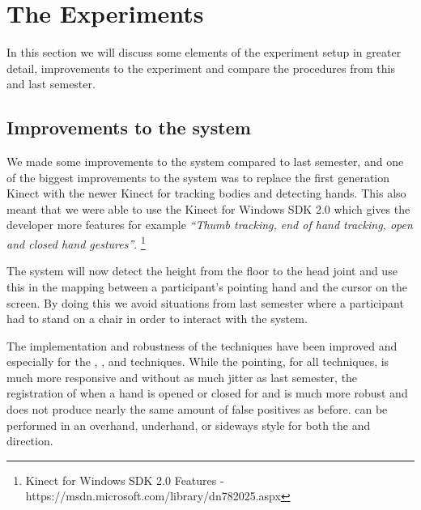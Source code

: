 \section*{The Experiments} \label{sec:experiments}
In this section we will discuss some elements of the experiment setup in greater detail, improvements to the experiment and compare the procedures from this and last semester.

\subsection*{Improvements to the system}\label{sec:systemImprovements}
We made some improvements to the system compared to last semester, and one of the biggest improvements to the system was to replace the first generation Kinect with the newer Kinect for tracking bodies and detecting hands.
This also meant that we were able to use the Kinect for Windows SDK 2.0 which gives the developer more features for example \textit{``Thumb tracking, end of hand tracking, open and closed hand gestures''}. \footnote{Kinect for Windows SDK 2.0 Features - https://msdn.microsoft.com/library/dn782025.aspx}

The system will now detect the height from the floor to the head joint and use this in the mapping between a participant's pointing hand and the cursor on the screen.
By doing this we avoid situations from last semester where a participant had to stand on a chair in order to interact with the system.

The implementation and robustness of the techniques have been improved and especially for the \pinch, \throw, and \tilt techniques.
While the pointing, for all techniques, is much more responsive and without as much jitter as last semester, the registration of when a hand is opened or closed for \pinch \push and \pinch \pull is much more robust and does not produce nearly the same amount of false positives as before.
\throw can be performed in an overhand, underhand, or sideways style for both the \pull and \push direction.


